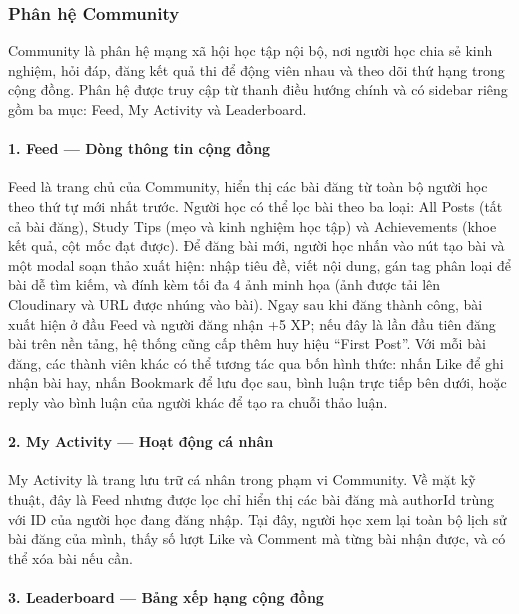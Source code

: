\subsubsection{Phân hệ Community}

Community là phân hệ mạng xã hội học tập nội bộ, nơi người học chia sẻ kinh nghiệm, hỏi đáp, đăng kết quả thi để động viên nhau và theo dõi thứ hạng trong cộng đồng. Phân hệ được truy cập từ thanh điều hướng chính và có sidebar riêng gồm ba mục: Feed, My Activity và Leaderboard.

\paragraph{1. Feed --- Dòng thông tin cộng đồng}

Feed là trang chủ của Community, hiển thị các bài đăng từ toàn bộ người học theo thứ tự mới nhất trước. Người học có thể lọc bài theo ba loại: All Posts (tất cả bài đăng), Study Tips (mẹo và kinh nghiệm học tập) và Achievements (khoe kết quả, cột mốc đạt được). Để đăng bài mới, người học nhấn vào nút tạo bài và một modal soạn thảo xuất hiện: nhập tiêu đề, viết nội dung, gán tag phân loại để bài dễ tìm kiếm, và đính kèm tối đa 4 ảnh minh họa (ảnh được tải lên Cloudinary và URL được nhúng vào bài). Ngay sau khi đăng thành công, bài xuất hiện ở đầu Feed và người đăng nhận +5 XP; nếu đây là lần đầu tiên đăng bài trên nền tảng, hệ thống cũng cấp thêm huy hiệu ``First Post''. Với mỗi bài đăng, các thành viên khác có thể tương tác qua bốn hình thức: nhấn Like để ghi nhận bài hay, nhấn Bookmark để lưu đọc sau, bình luận trực tiếp bên dưới, hoặc reply vào bình luận của người khác để tạo ra chuỗi thảo luận.

\paragraph{2. My Activity --- Hoạt động cá nhân}

My Activity là trang lưu trữ cá nhân trong phạm vi Community. Về mặt kỹ thuật, đây là Feed nhưng được lọc chỉ hiển thị các bài đăng mà authorId trùng với ID của người học đang đăng nhập. Tại đây, người học xem lại toàn bộ lịch sử bài đăng của mình, thấy số lượt Like và Comment mà từng bài nhận được, và có thể xóa bài nếu cần.

\paragraph{3. Leaderboard --- Bảng xếp hạng cộng đồng}

